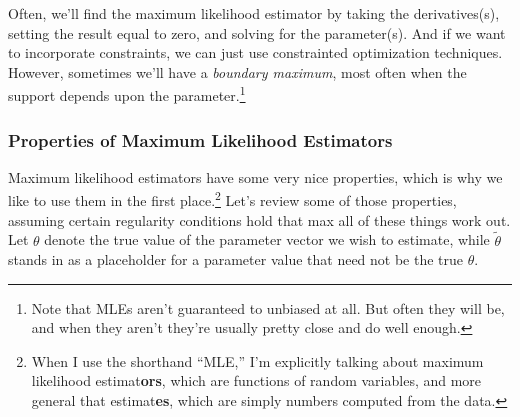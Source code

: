 \documentclass[12pt]{article}
\theoremstyle{plain}
\theoremstyle{definition}
\theoremstyle{remark}
\begin{document}
Often, we'll find the maximum likelihood estimator by taking the
derivatives(s), setting the result equal to zero, and solving for the
parameter(s).  And if we want to incorporate constraints, we can just
use constrainted optimization techniques.  However, sometimes we'll have
a \emph{boundary maximum}, most often when the support depends upon the
parameter.\footnote{%
Note that MLEs aren't guaranteed to unbiased at all. But often they will
be, and when they aren't they're usually pretty close and do well
enough.}


\subsubsection{Properties of Maximum Likelihood Estimators}

Maximum likelihood estimators have some very nice properties, which
is why we like to use them in the first place.\footnote{%
When I use the shorthand ``MLE,'' I'm explicitly talking about maximum
likelihood estimat\textbf{ors}, which are functions of random variables,
and more general that estimat\textbf{es}, which are simply numbers
computed from the data.}
Let's review some of those properties, assuming certain regularity
conditions hold that max all of these things work out.
Let $\theta$ denote the true value of the parameter vector we wish to
estimate, while $\tilde{\theta}$ stands in as a placeholder for a
parameter value that need not be the true $\theta$.
\end{document}
